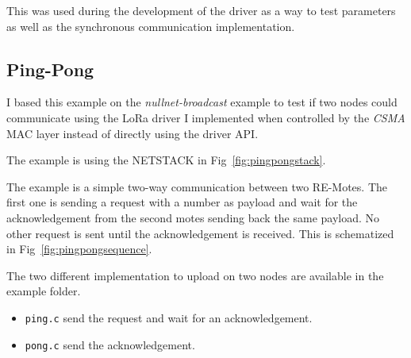 This was used during the development of the driver as a way to test parameters
as well as the synchronous communication implementation.

\subsection{Ping-Pong}

I based this example on the \emph{nullnet-broadcast} example to test if two
nodes could communicate using the LoRa driver I implemented when controlled by
the \emph{CSMA} MAC layer instead of directly using the driver API\@.

The example is using the NETSTACK in Fig~\ref{fig:pingpongstack}.



The example is a simple two-way communication between two RE-Motes. 
The first one is sending a request with a number as
payload and wait for the acknowledgement from the second motes sending back
the same payload. 
No other request is sent until the acknowledgement is received.
This is schematized in Fig~\ref{fig:pingpongsequence}.

The two different implementation to upload on two nodes are available in the
example folder.

\begin{itemize}
  \item \lstinline{ping.c} send the request and wait for an acknowledgement.
  \item \lstinline{pong.c} send the acknowledgement.
\end{itemize}


